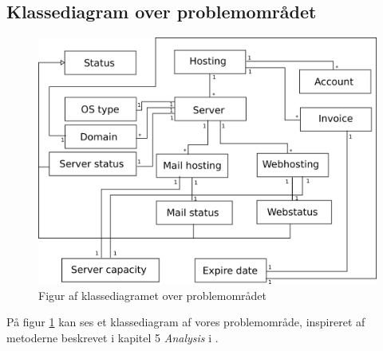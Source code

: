 \documentclass[12pt]{article}
\begin{document}
\subsection{Klassediagram over problemområdet}
\label{class_diagram_section}
\begin{figure}[h]
	\centering
	\includegraphics[width=13cm]{class_diagram_v2.png}
	\caption{Figur af klassediagramet over problemområdet}
	\label{classdiagram}
\end{figure}
På figur \ref{classdiagram} kan ses et klassediagram af vores problemområde, inspireret af metoderne beskrevet i kapitel 5 \emph{Analysis} i \cite{OOSE}. 
\end{document}
